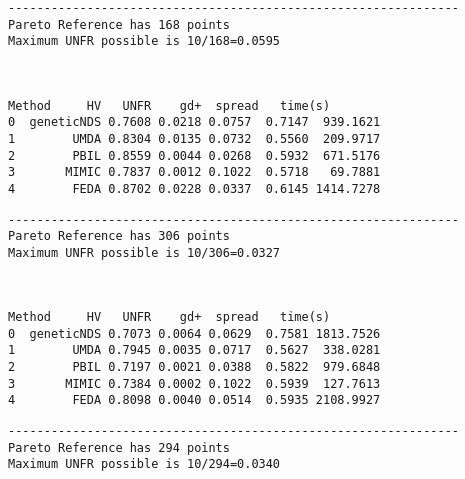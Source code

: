\documentclass[11pt]{article}
\begin{document}
    
    \begin{Verbatim}[commandchars=\\\{\}]
---------------------------------------------------------------
Pareto Reference has 168 points
Maximum UNFR possible is 10/168=0.0595
    \end{Verbatim}

    \begin{center}
    \end{center}
    { \hspace*{\fill} \\}
    
    
    \begin{Verbatim}[commandchars=\\\{\}]
       Method     HV   UNFR    gd+  spread   time(s)
0  geneticNDS 0.7608 0.0218 0.0757  0.7147  939.1621
1        UMDA 0.8304 0.0135 0.0732  0.5560  209.9717
2        PBIL 0.8559 0.0044 0.0268  0.5932  671.5176
3       MIMIC 0.7837 0.0012 0.1022  0.5718   69.7881
4        FEDA 0.8702 0.0228 0.0337  0.6145 1414.7278
    \end{Verbatim}

    
    \begin{Verbatim}[commandchars=\\\{\}]
---------------------------------------------------------------
Pareto Reference has 306 points
Maximum UNFR possible is 10/306=0.0327
    \end{Verbatim}

    \begin{center}
    \end{center}
    { \hspace*{\fill} \\}
    
    
    \begin{Verbatim}[commandchars=\\\{\}]
       Method     HV   UNFR    gd+  spread   time(s)
0  geneticNDS 0.7073 0.0064 0.0629  0.7581 1813.7526
1        UMDA 0.7945 0.0035 0.0717  0.5627  338.0281
2        PBIL 0.7197 0.0021 0.0388  0.5822  979.6848
3       MIMIC 0.7384 0.0002 0.1022  0.5939  127.7613
4        FEDA 0.8098 0.0040 0.0514  0.5935 2108.9927
    \end{Verbatim}

    
    \begin{Verbatim}[commandchars=\\\{\}]
---------------------------------------------------------------
Pareto Reference has 294 points
Maximum UNFR possible is 10/294=0.0340
    \end{Verbatim}
\end{document}
